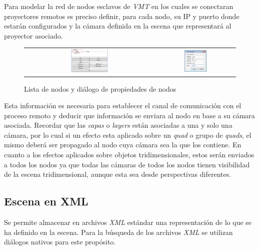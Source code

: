 Para modelar la red de nodos esclavos de \emph{VMT} en los cuales se conectaran proyectores remotos es preciso definir, para cada nodo, su IP y puerto donde estarán configurados y la cámara definida en la escena que representará al proyector asociado.

\begin{figure}
	\begin{center}
		\begin{tabular}[c]{cc}
			\includegraphics[width=0.3\textwidth]{./Cap5_vmt/vmt_nodeProperties_1.png}
				&        
			\includegraphics[width=0.3\textwidth]{./Cap5_vmt/vmt_nodeProperties_2.png}
		\end{tabular}
	\end{center}
	\caption{Lista de nodos y diálogo de propiedades de nodos}
	\label{fig:VMT-Nodes}
\end{figure}

Esta información es necesaria para establecer el canal de comunicación con el proceso remoto y deducir que información se enviara al nodo en base a su cámara asociada. Recordar que las \emph{capas} o \emph{layers} están asociadas a una y solo una cámara, por lo cual si un efecto esta aplicado sobre un \emph{quad} o grupo de \emph{quads}, el mismo deberá ser propagado al nodo cuya cámara sea la que los contiene. En cuanto a los efectos aplicados sobre objetos tridimensionales, estos serán enviados a todos los nodos ya que todas las cámaras de todos los nodos tienen visibilidad de la escena tridimensional, aunque esta sea desde perspectivas diferentes.

\subsection{Escena en XML}
Se permite almacenar en archivos \emph{XML} estándar una representación de lo que se ha definido en la escena. Para la búsqueda de los archivos \emph{XML} se utilizan diálogos nativos para este propósito.

